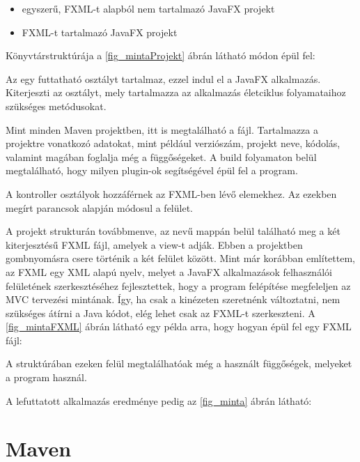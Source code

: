 \begin{itemize}
\setlength\itemsep{0em}
\item egyszerű, FXML-t alapból nem tartalmazó JavaFX projekt 
\item FXML-t tartalmazó JavaFX projekt 
\end{itemize}

Könyvtárstruktúrája a \ref{fig_mintaProjekt} ábrán látható módon épül fel: 



Az  egy futtatható osztályt tartalmaz, ezzel indul el a JavaFX alkalmazás.
Kiterjeszti az  osztályt, mely tartalmazza az alkalmazás életciklus folyamataihoz szükséges metódusokat.

Mint minden Maven projektben, itt is megtalálható a  fájl.
Tartalmazza a projektre vonatkozó adatokat, mint például verziószám, projekt neve, kódolás, valamint magában foglalja még a függőségeket.
A build folyamaton belül megtalálható, hogy milyen plugin-ok segítségével épül fel a program. 

A kontroller osztályok hozzáférnek az FXML-ben lévő elemekhez.
Az ezekben megírt parancsok alapján módosul a felület. 

A projekt strukturán továbbmenve, az  nevű mappán belül található meg a két  kiterjesztésű FXML fájl, amelyek a view-t adják.
Ebben a projektben gombnyomásra csere történik a két felület között.
Mint már korábban említettem, az FXML egy XML alapú nyelv, melyet a JavaFX alkalmazások felhasználói felületének szerkesztéséhez fejlesztettek, hogy a program felépítése megfeleljen az MVC tervezési mintának.
Így, ha csak a kinézeten szeretnénk változtatni, nem szükséges átírni a Java kódot, elég lehet csak az FXML-t szerkeszteni.
A \ref{fig_mintaFXML} ábrán látható egy példa arra, hogy hogyan épül fel egy FXML fájl: 


A struktúrában ezeken felül megtalálhatóak még a használt függőségek, melyeket a program használ. 

A lefuttatott alkalmazás eredménye pedig az \ref{fig_minta} ábrán látható:

%



\section{Maven}

